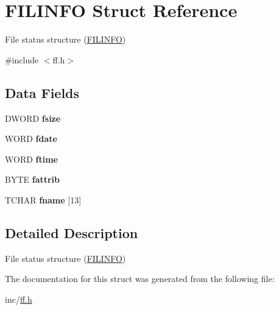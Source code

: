 \hypertarget{structFILINFO}{}\section{F\+I\+L\+I\+N\+FO Struct Reference}
\label{structFILINFO}


File status structure (\hyperlink{structFILINFO}{F\+I\+L\+I\+N\+FO})  




{\ttfamily \#include $<$ff.\+h$>$}

\subsection*{Data Fields}
\begin{DoxyCompactItemize}
\item 
D\+W\+O\+RD {\bfseries fsize}\hypertarget{structFILINFO_aee7441af7dc0c443d1e1e6011cc7dcac}{}\label{structFILINFO_aee7441af7dc0c443d1e1e6011cc7dcac}

\item 
W\+O\+RD {\bfseries fdate}\hypertarget{structFILINFO_a7c01c48a15b1b49da459924437b0bd52}{}\label{structFILINFO_a7c01c48a15b1b49da459924437b0bd52}

\item 
W\+O\+RD {\bfseries ftime}\hypertarget{structFILINFO_ae0f751b79621bf7b29669f177bbe6b9a}{}\label{structFILINFO_ae0f751b79621bf7b29669f177bbe6b9a}

\item 
B\+Y\+TE {\bfseries fattrib}\hypertarget{structFILINFO_a838d542585831b085537b363f18205c0}{}\label{structFILINFO_a838d542585831b085537b363f18205c0}

\item 
T\+C\+H\+AR {\bfseries fname} \mbox{[}13\mbox{]}\hypertarget{structFILINFO_abd852510f2f79b4ec773156d8942dc7c}{}\label{structFILINFO_abd852510f2f79b4ec773156d8942dc7c}

\end{DoxyCompactItemize}


\subsection{Detailed Description}
File status structure (\hyperlink{structFILINFO}{F\+I\+L\+I\+N\+FO}) 

The documentation for this struct was generated from the following file\+:\begin{DoxyCompactItemize}
\item 
inc/\hyperlink{ff_8h}{ff.\+h}\end{DoxyCompactItemize}
